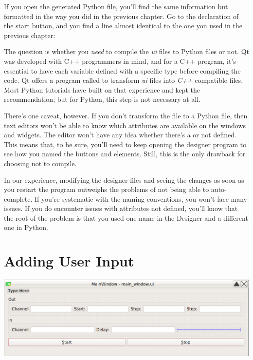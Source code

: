 If you open the generated Python file, you'll find the same information but formatted in the way you did in the previous chapter. Go to the declaration of the start button, and you find a line almost identical to the one you used in the previous chapter:


The question is whether you \emph{need} to compile the \textit{ui} files to Python files or not. Qt was developed with C++ programmers in mind, and for a C++ program, it's essential to have each variable defined with a specific type before compiling the code. Qt offers a program called  to transform \textit{ui} files into \textit{C++} compatible files. Most Python tutorials have built on that experience and kept the recommendation; but for Python, this step is not necessary at all.

There's one caveat, however. If you don't transform the file to a Python file, then text editors won't be able to know which attributes are available on the windows and widgets. The editor won't have any idea whether there's a  or not defined. This means that, to be sure, you'll need to keep opening the designer program to see how you named the buttons and elements. Still, this is the only drawback for choosing not to compile.

In our experience, modifying the designer files and seeing the changes as soon as you restart the program outweighs the problems of not being able to auto-complete. If you're systematic with the naming conventions, you won't face many issues. If you do encounter issues with attributes not defined, you'll know that the root of the problem is that you used one name in the Designer and a different one in Python.

\section{Adding User Input}\label{sec:adding-user-input}
\begin{center}
    \includegraphics[width=.5\textwidth]{images/Chapter_09/08_final_window_example.png}
\end{center}

